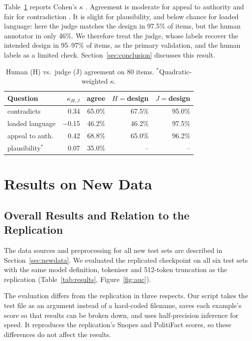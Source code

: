 \documentclass[11pt]{article}
\begin{document}
Table~\ref{tab:kappa} reports Cohen's $\kappa$ \citep{cohen1960kappa}. Agreement is moderate for appeal to authority and fair for contradiction \citep{landis1977measurement}. It is slight for plausibility, and below chance for loaded language: here the judge matches the design in 97.5\% of items, but the human annotator in only 46\%. We therefore treat the judge, whose labels recover the intended design in 95--97\% of items, as the primary validation, and the human labels as a limited check. Section~\ref{sec:conclusion} discusses this result.

\begin{table}[t]
\centering\small
\setlength{\tabcolsep}{3.5pt}
\begin{tabular}{lrrrr}
\toprule
Question & $\kappa_{H,J}$ & agree & $H{=}$design & $J{=}$design \\
\midrule
contradicts & 0.34 & 65.0\% & 67.5\% & 95.0\% \\
loaded language & $-$0.15 & 46.2\% & 46.2\% & 97.5\% \\
appeal to auth. & 0.42 & 68.8\% & 65.0\% & 96.2\% \\
plausibility$^\ast$ & 0.07 & 35.0\% & -- & -- \\
\bottomrule
\end{tabular}
\caption{Human (H) vs.\ judge (J) agreement on 80 items. $^\ast$Quadratic-weighted $\kappa$.}
\label{tab:kappa}
\end{table}

\section{Results on New Data}
\label{sec:results}

\subsection{Overall Results and Relation to the Replication}

The data sources and preprocessing for all new test sets are described in Section~\ref{sec:newdata}. We evaluated the replicated checkpoint on all six test sets with the same model definition, tokeniser and 512-token truncation as the replication (Table~\ref{tab:results}, Figure~\ref{fig:auc}).

The evaluation differs from the replication in three respects. Our script takes the test file as an argument instead of a hard-coded filename, saves each example's score so that results can be broken down, and uses half-precision inference for speed. It reproduces the replication's Snopes and PolitiFact scores, so these differences do not affect the results.
\end{document}
